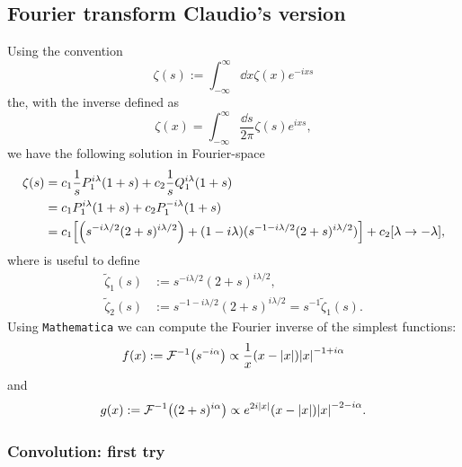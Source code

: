 \documentclass[%
 aip,
 jmp,%
 amsmath,amssymb,
 reprint,%
]{revtex4-2}
\begin{document}
\subsection{Fourier transform Claudio's version}

Using the convention
\begin{equation}\label{eq:claudios-convention}
\zeta(s) := \int_{-\infty}^\infty \dd{x}\zeta(x)e^{-ixs}
\end{equation}
the, with the inverse defined as
\begin{equation*}
\zeta(x) = \int_{-\infty}^\infty \frac{\dd{s}}{2\pi}\zeta(s)e^{ixs},
\end{equation*}
we have the following solution in Fourier-space
\begin{equation}
\begin{aligned}
\zeta(s) &= c_1\frac{1}{s}P_1^{i\lambda}(1+s) + c_2\frac{1}{s}Q_1^{i\lambda}(1+s)\\
&= c_1P_1^{i\lambda}(1+s) + c_2P_1^{-i\lambda}(1+s)\\
&= c_1\qty[\qty(s^{-i\lambda/2}(2+s)^{i\lambda/2}) + (1- i\lambda)(s^{-1-i\lambda/2}(2+s)^{i\lambda/2})] + c_2\qty[\lambda\to-\lambda],
\end{aligned}
\end{equation}
where is useful to define
\begin{equation}
\begin{aligned}
\tilde{\zeta}_1(s) &:= s^{-i\lambda/2}(2+s)^{i\lambda/2},\\
\tilde{\zeta}_2(s) &:= s^{-1-i\lambda/2}(2+s)^{i\lambda/2} = s^{-1}\tilde{\zeta}_1(s).
\end{aligned}
\end{equation}
Using \texttt{Mathematica} we can compute the Fourier inverse of the simplest functions:
\begin{equation}
f(x) := \mathcal{F}^{-1}\qty(s^{-i\alpha}) \propto  \frac{1}{x}(x-\abs{x}){\abs{x}}^{-1+i\alpha}
\end{equation}
and
\begin{equation}
g(x) := \mathcal{F}^{-1}\qty((2+s)^{i\alpha}) \propto e^{2i\abs{x}}(x - \abs{x}){\abs{x}}^{-2-i\alpha}.
\end{equation}

\subsubsection{Convolution: first try}
\end{document}
